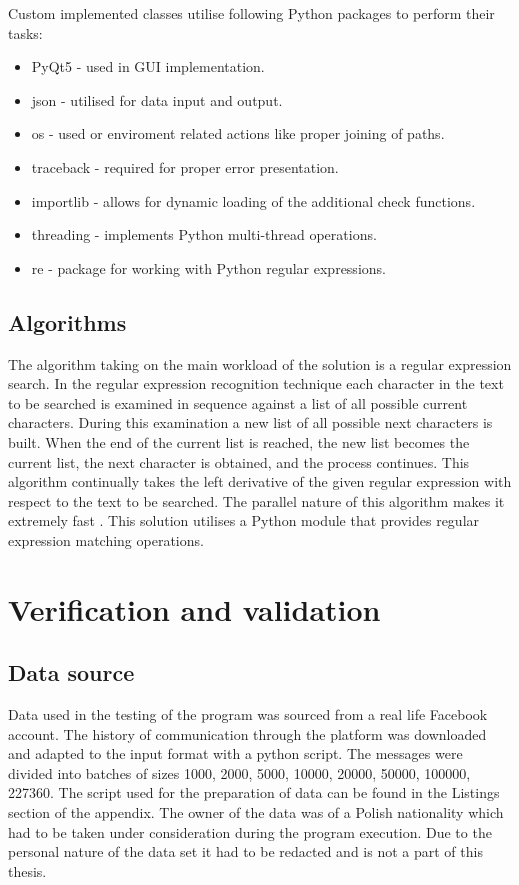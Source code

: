 \documentclass[a4paper,twoside,12pt]{book}
\begin{document}
Custom implemented classes utilise following Python packages to perform their tasks: 

\begin{itemize}
   \item PyQt5 - used in GUI implementation.
   \item json - utilised for data input and output.
   \item os - used or enviroment related actions like proper joining of paths.
   \item traceback - required for proper error presentation.
   \item importlib - allows for dynamic loading of the additional check functions.
   \item threading - implements Python multi-thread operations.
   \item re - package for working with Python regular expressions.
\end{itemize}

\section{Algorithms}

The algorithm taking on the main workload of the solution is a regular expression search. In the regular expression recognition technique each character in the text to be searched is examined in sequence against a 
list of all possible current characters. During this examination a new list of all possible next characters is built. When the end of the current list is reached, the new list becomes the current list, the next 
character is obtained, and the process continues. This algorithm continually takes the left derivative of the given regular expression with respect to the text to be searched. The parallel nature of this algorithm 
makes it extremely fast \cite{bib:articleRE}. This solution utilises a Python module that provides regular expression matching operations.

\chapter{Verification and validation}

\section{Data source}

Data used in the testing of the program was sourced from a real life Facebook account. The history of communication through the platform was downloaded and adapted to the input format with a python script.
The messages were divided into batches of sizes 1000, 2000, 5000, 10000, 20000, 50000, 100000, 227360. The script used for the preparation of data can be found in the Listings section of the appendix.
The owner of the data was of a Polish nationality which had to be taken under consideration during the program execution. Due to the personal nature of the data set it had to be 
redacted and is not a part of this thesis.
\end{document}
